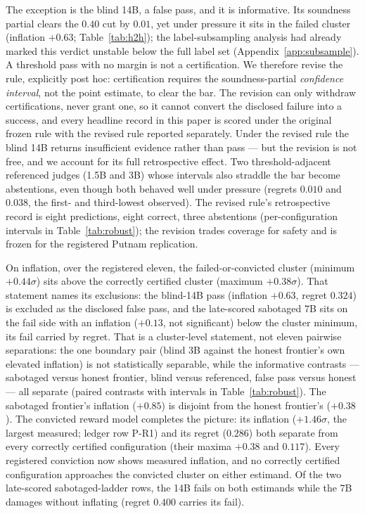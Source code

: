 The exception is the blind 14B, a false pass, and it is informative.
Its soundness partial clears the $0.40$ cut by $0.01$, yet under pressure it sits in the failed cluster (inflation $+0.63$; Table~\ref{tab:h2h}); the label-subsampling analysis had already marked this verdict unstable below the full label set (Appendix~\ref{app:subsample}).
A threshold pass with no margin is not a certification.
We therefore revise the rule, explicitly post hoc: certification requires the soundness-partial \emph{confidence interval}, not the point estimate, to clear the bar.
The revision can only withdraw certifications, never grant one, so it cannot convert the disclosed failure into a success, and every headline record in this paper is scored under the original frozen rule with the revised rule reported separately.
Under the revised rule the blind 14B returns insufficient evidence rather than pass --- but the revision is not free, and we account for its full retrospective effect.
Two threshold-adjacent referenced judges (1.5B and 3B) whose intervals also straddle the bar become abstentions, even though both behaved well under pressure (regrets $0.010$ and $0.038$, the first- and third-lowest observed).
The revised rule's retrospective record is eight predictions, eight correct, three abstentions (per-configuration intervals in Table~\ref{tab:robust}); the revision trades coverage for safety and is frozen for the registered Putnam replication.

On inflation, over the registered eleven, the failed-or-convicted cluster (minimum $+0.44\sigma$) sits above the correctly certified cluster (maximum $+0.38\sigma$).
That statement names its exclusions: the blind-14B pass (inflation $+0.63$, regret $0.324$) is excluded as the disclosed false pass, and the late-scored sabotaged 7B sits on the fail side with an inflation ($+0.13$, not significant) below the cluster minimum, its fail carried by regret.
That is a cluster-level statement, not eleven pairwise separations: the one boundary pair (blind 3B against the honest frontier's own elevated inflation) is not statistically separable, while the informative contrasts --- sabotaged versus honest frontier, blind versus referenced, false pass versus honest --- all separate (paired contrasts with intervals in Table~\ref{tab:robust}).
The sabotaged frontier's inflation ($+0.85$) is disjoint from the honest frontier's ($+0.38$).
The convicted reward model completes the picture: its inflation ($+1.46\sigma$, the largest measured; ledger row P-R1) and its regret ($0.286$) both separate from every correctly certified configuration (their maxima $+0.38$ and $0.117$).
Every registered conviction now shows measured inflation, and no correctly certified configuration approaches the convicted cluster on either estimand.
Of the two late-scored sabotaged-ladder rows, the 14B fails on both estimands while the 7B damages without inflating (regret $0.400$ carries its fail).


